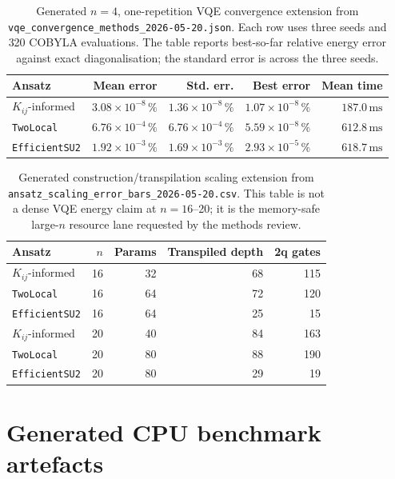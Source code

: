 \documentclass[preprint,aps,physrev,superscriptaddress,floatfix,longbibliography]{revtex4-2}
\begin{document}
\begin{table}[tb]
\centering
\small
\begin{tabular}{lrrrr}
\toprule
Ansatz & Mean error & Std. err. & Best error & Mean time \\
\midrule
$K_{ij}$-informed & $3.08\times10^{-8}\,\%$ & $1.36\times10^{-8}\,\%$ & $1.07\times10^{-8}\,\%$ & $187.0\,\mathrm{ms}$ \\
\texttt{TwoLocal} & $6.76\times10^{-4}\,\%$ & $6.76\times10^{-4}\,\%$ & $5.59\times10^{-8}\,\%$ & $612.8\,\mathrm{ms}$ \\
\texttt{EfficientSU2} & $1.92\times10^{-3}\,\%$ & $1.69\times10^{-3}\,\%$ & $2.93\times10^{-5}\,\%$ & $618.7\,\mathrm{ms}$ \\
\bottomrule
\end{tabular}
\caption{Generated $n=4$, one-repetition VQE convergence extension from
\texttt{vqe\_convergence\_methods\_2026-05-20.json}. Each row uses three
seeds and 320 COBYLA evaluations. The table reports best-so-far relative
energy error against exact diagonalisation; the standard error is across
the three seeds.}
\label{tab:vqeconvergence}
\end{table}

\begin{table}[tb]
\centering
\small
\begin{tabular}{lrrrr}
\toprule
Ansatz & $n$ & Params & Transpiled depth & 2q gates \\
\midrule
$K_{ij}$-informed & 16 & 32 & 68 & 115 \\
\texttt{TwoLocal} & 16 & 64 & 72 & 120 \\
\texttt{EfficientSU2} & 16 & 64 & 25 & 15 \\
$K_{ij}$-informed & 20 & 40 & 84 & 163 \\
\texttt{TwoLocal} & 20 & 80 & 88 & 190 \\
\texttt{EfficientSU2} & 20 & 80 & 29 & 19 \\
\bottomrule
\end{tabular}
\caption{Generated construction/transpilation scaling extension from
\texttt{ansatz\_scaling\_error\_bars\_2026-05-20.csv}. This table is
not a dense VQE energy claim at $n=16$--20; it is the memory-safe
large-$n$ resource lane requested by the methods review.}
\label{tab:largenscaling}
\end{table}

\section{Generated CPU benchmark artefacts}
\end{document}
